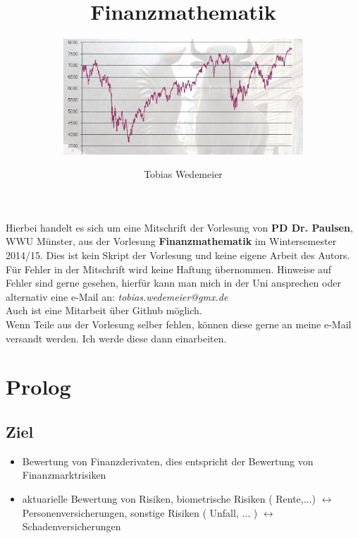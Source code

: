 \documentclass[a4paper, pagesize=pdftex, pdftex, twoside, headsepline, index=totoc,toc=listof, fontsize=10pt, cleardoublepage=empty, headinclude, DIV=13, BCOR=13mm]{scrartcl}
\author{Tobias Wedemeier}
\title{Finanzmathematik}
\subtitle{\includegraphics[width=9cm]{Bilder/boerse.jpg}}
\begin{document}
\maketitle
\thispagestyle{empty}
\newpage

\thispagestyle{empty}
\vspace*{\fill}
\begin{center}
	Hierbei handelt es sich um eine Mitschrift der Vorlesung von \textbf{PD Dr. Paulsen}, WWU Münster, aus der Vorlesung \textbf{Finanzmathematik} im Wintersemester 2014/15. Dies ist kein Skript der Vorlesung und keine eigene Arbeit des Autors.\\
	\vspace{2cm}
	Für Fehler in der Mitschrift wird keine Haftung übernommen. Hinweise auf Fehler sind gerne gesehen, hierfür kann man mich in der Uni ansprechen oder alternativ eine e-Mail an: \textit{tobias.wedemeier@gmx.de}\\
	Auch ist eine Mitarbeit über Github möglich.\\
	\vspace{2cm}
	Wenn Teile aus der Vorlesung selber fehlen, können diese gerne an meine e-Mail versandt werden. Ich werde diese dann einarbeiten.
\end{center}
\vspace*{\fill}
\newpage


\tableofcontents
\cleardoubleoddemptypage %

\setcounter{page}{1}

\section*{Prolog}  %
\label{sec:prolog}

\subsection*{Ziel} %
\label{sub:ziel}

\begin{itemize}
	\item Bewertung von Finanzderivaten, dies entspricht der Bewertung von Finanzmarktrisiken
	\item aktuarielle Bewertung von Risiken, biometrische Risiken ( Rente,$\dots$) $\leftrightarrow$ Personenversicherungen,
		sonstige Risiken ( Unfall, $\dots$ ) $\leftrightarrow$ Schadenversicherungen
\end{itemize}
\end{document}
